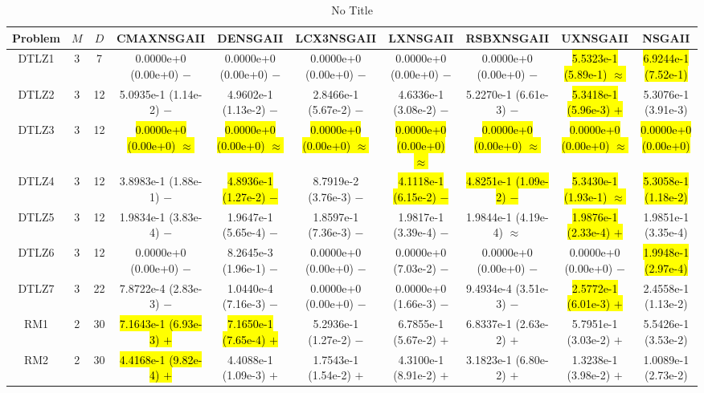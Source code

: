 \documentclass[journal]{IEEEtran}
\begin{document}
\begin{table*}[htbp]
\renewcommand{\arraystretch}{1.2}
\centering
\caption{No Title}
\begin{tabular}{cccccccccc}
\toprule
Problem&$M$&$D$&CMAXNSGAII&DENSGAII&LCX3NSGAII&LXNSGAII&RSBXNSGAII&UXNSGAII&NSGAII\\
\midrule
\multirow{1}{*}{DTLZ1}&3&7&0.0000e+0 (0.00e+0) $-$&0.0000e+0 (0.00e+0) $-$&0.0000e+0 (0.00e+0) $-$&0.0000e+0 (0.00e+0) $-$&0.0000e+0 (0.00e+0) $-$&\hl{5.5323e-1 (5.89e-1) $\approx$}&\hl{6.9244e-1 (7.52e-1)}\\
\hline
\multirow{1}{*}{DTLZ2}&3&12&5.0935e-1 (1.14e-2) $-$&4.9602e-1 (1.13e-2) $-$&2.8466e-1 (5.67e-2) $-$&4.6336e-1 (3.08e-2) $-$&5.2270e-1 (6.61e-3) $-$&\hl{5.3418e-1 (5.96e-3) $+$}&5.3076e-1 (3.91e-3)\\
\hline
\multirow{1}{*}{DTLZ3}&3&12&\hl{0.0000e+0 (0.00e+0) $\approx$}&\hl{0.0000e+0 (0.00e+0) $\approx$}&\hl{0.0000e+0 (0.00e+0) $\approx$}&\hl{0.0000e+0 (0.00e+0) $\approx$}&\hl{0.0000e+0 (0.00e+0) $\approx$}&\hl{0.0000e+0 (0.00e+0) $\approx$}&\hl{0.0000e+0 (0.00e+0)}\\
\hline
\multirow{1}{*}{DTLZ4}&3&12&3.8983e-1 (1.88e-1) $-$&\hl{4.8936e-1 (1.27e-2) $-$}&8.7919e-2 (3.76e-3) $-$&\hl{4.1118e-1 (6.15e-2) $-$}&\hl{4.8251e-1 (1.09e-2) $-$}&\hl{5.3430e-1 (1.93e-1) $\approx$}&\hl{5.3058e-1 (1.18e-2)}\\
\hline
\multirow{1}{*}{DTLZ5}&3&12&1.9834e-1 (3.83e-4) $-$&1.9647e-1 (5.65e-4) $-$&1.8597e-1 (7.36e-3) $-$&1.9817e-1 (3.39e-4) $-$&1.9844e-1 (4.19e-4) $\approx$&\hl{1.9876e-1 (2.33e-4) $+$}&1.9851e-1 (3.35e-4)\\
\hline
\multirow{1}{*}{DTLZ6}&3&12&0.0000e+0 (0.00e+0) $-$&8.2645e-3 (1.96e-1) $-$&0.0000e+0 (0.00e+0) $-$&0.0000e+0 (7.03e-2) $-$&0.0000e+0 (0.00e+0) $-$&0.0000e+0 (0.00e+0) $-$&\hl{1.9948e-1 (2.97e-4)}\\
\hline
\multirow{1}{*}{DTLZ7}&3&22&7.8722e-4 (2.83e-3) $-$&1.0440e-4 (7.16e-3) $-$&0.0000e+0 (0.00e+0) $-$&0.0000e+0 (1.66e-3) $-$&9.4934e-4 (3.51e-3) $-$&\hl{2.5772e-1 (6.01e-3) $+$}&2.4558e-1 (1.13e-2)\\
\hline
\multirow{1}{*}{RM1}&2&30&\hl{7.1643e-1 (6.93e-3) $+$}&\hl{7.1650e-1 (7.65e-4) $+$}&5.2936e-1 (1.27e-2) $-$&6.7855e-1 (5.67e-2) $+$&6.8337e-1 (2.63e-2) $+$&5.7951e-1 (3.03e-2) $+$&5.5426e-1 (3.53e-2)\\
\hline
\multirow{1}{*}{RM2}&2&30&\hl{4.4168e-1 (9.82e-4) $+$}&4.4088e-1 (1.09e-3) $+$&1.7543e-1 (1.54e-2) $+$&4.3100e-1 (8.91e-2) $+$&3.1823e-1 (6.80e-2) $+$&1.3238e-1 (3.98e-2) $+$&1.0089e-1 (2.73e-2)\\

\end{tabular}
\end{table*}
\end{document}
